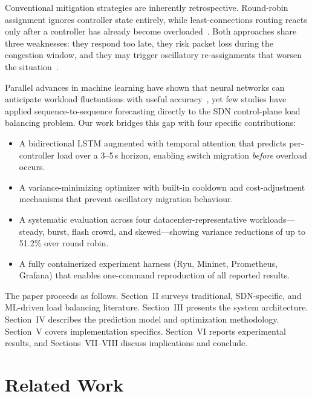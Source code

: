 \documentclass[conference]{IEEEtran}
\begin{document}
Conventional mitigation strategies are inherently retrospective. Round-robin assignment ignores controller state entirely, while least-connections routing reacts only after a controller has already become overloaded~\cite{praveen2022adaptive}. Both approaches share three weaknesses: they respond too late, they risk packet loss during the congestion window, and they may trigger oscillatory re-assignments that worsen the situation~\cite{gokilabharathi2018efficient}.

Parallel advances in machine learning have shown that neural networks can anticipate workload fluctuations with useful accuracy~\cite{hou2021research,hsu2021mobility}, yet few studies have applied sequence-to-sequence forecasting directly to the SDN control-plane load balancing problem. Our work bridges this gap with four specific contributions:

\begin{itemize}
    \item A bidirectional LSTM augmented with temporal attention that predicts per-controller load over a 3--5\,s horizon, enabling switch migration \emph{before} overload occurs.
    \item A variance-minimizing optimizer with built-in cooldown and cost-adjustment mechanisms that prevent oscillatory migration behaviour.
    \item A systematic evaluation across four datacenter-representative workloads---steady, burst, flash crowd, and skewed---showing variance reductions of up to 51.2\% over round robin.
    \item A fully containerized experiment harness (Ryu, Mininet, Prometheus, Grafana) that enables one-command reproduction of all reported results.
\end{itemize}

The paper proceeds as follows. Section~II surveys traditional, SDN-specific, and ML-driven load balancing literature. Section~III presents the system architecture. Section~IV describes the prediction model and optimization methodology. Section~V covers implementation specifics. Section~VI reports experimental results, and Sections~VII--VIII discuss implications and conclude.

\section{Related Work}
\end{document}
